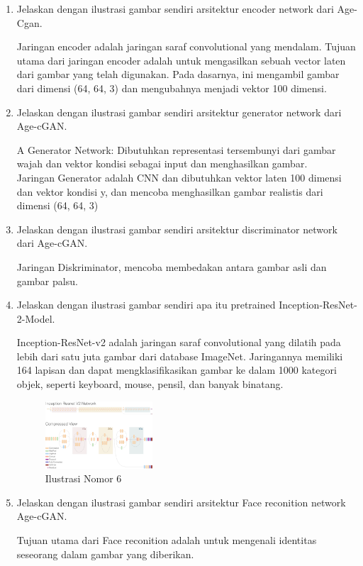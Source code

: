 \begin{enumerate}
\item Jelaskan dengan ilustrasi gambar sendiri arsitektur encoder network dari Age-Cgan.

Jaringan encoder adalah jaringan saraf convolutional yang mendalam. Tujuan utama dari jaringan encoder adalah untuk mengasilkan sebuah vector laten dari gambar yang telah digunakan. Pada dasarnya, ini mengambil gambar dari dimensi (64, 64, 3) dan mengubahnya menjadi vektor 100 dimensi.

\item Jelaskan dengan ilustrasi gambar sendiri arsitektur generator network dari Age-cGAN.

A Generator Network: Dibutuhkan representasi tersembunyi dari gambar wajah dan vektor kondisi sebagai input dan menghasilkan gambar.\\
Jaringan Generator adalah CNN dan dibutuhkan vektor laten 100 dimensi dan vektor kondisi y, dan mencoba menghasilkan gambar realistis dari dimensi (64, 64, 3)

\item Jelaskan dengan ilustrasi gambar sendiri arsitektur discriminator network dari Age-cGAN.

Jaringan Diskriminator, mencoba membedakan antara gambar asli dan gambar palsu.

\item Jelaskan dengan ilustrasi gambar sendiri apa itu pretrained Inception-ResNet-2-Model.

Inception-ResNet-v2 adalah jaringan saraf convolutional yang dilatih pada lebih dari satu juta gambar dari database ImageNet. Jaringannya memiliki 164 lapisan dan dapat mengklasifikasikan gambar ke dalam 1000 kategori objek, seperti keyboard, mouse, pensil, dan banyak binatang. 

\begin{figure}
	\includegraphics[width=4cm]{figures/1174062/9/nomor6.png}
	\centering
	\caption{Ilustrasi Nomor 6 }
\end{figure}

\item Jelaskan dengan ilustrasi gambar sendiri arsitektur Face reconition network Age-cGAN. 

Tujuan utama dari Face reconition adalah untuk mengenali identitas seseorang dalam gambar yang diberikan.


\end{enumerate}
